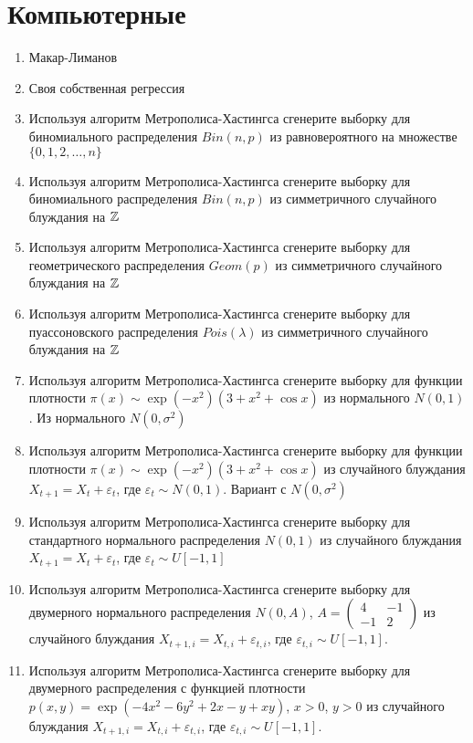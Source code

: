 \documentclass[pdftex,12pt,a4paper]{article}
\begin{document}
\section{Компьютерные}

\begin{enumerate}
\item Макар-Лиманов
\item Своя собственная регрессия 


\item Используя алгоритм Метрополиса-Хастингса сгенерите выборку для биномиального распределения $Bin(n,p)$ из равновероятного на множестве $\{0,1,2,\ldots,n\}$

\item Используя алгоритм Метрополиса-Хастингса сгенерите выборку для биномиального распределения $Bin(n,p)$ из симметричного случайного блуждания на $\mathbb Z$

\item Используя алгоритм Метрополиса-Хастингса сгенерите выборку для геометрического распределения $Geom(p)$ из симметричного случайного блуждания на $\mathbb Z$

\item Используя алгоритм Метрополиса-Хастингса сгенерите выборку для пуассоновского распределения $Pois(\lambda)$ из симметричного случайного блуждания на $\mathbb Z$

\item Используя алгоритм Метрополиса-Хастингса сгенерите выборку для функции плотности $\pi(x)\sim \exp(-x^2)(3+x^2+\cos x)$ из нормального $N(0,1)$. Из нормального $N(0,\sigma^2)$

\item Используя алгоритм Метрополиса-Хастингса сгенерите выборку для функции плотности $\pi(x)\sim \exp(-x^2)(3+x^2+\cos x)$ из случайного блуждания $X_{t+1}=X_t+\varepsilon_t$, где $\varepsilon_t\sim N(0,1)$. Вариант с $N(0,\sigma^2)$

\item Используя алгоритм Метрополиса-Хастингса сгенерите выборку для стандартного нормального распределения $N(0,1)$ из случайного блуждания $X_{t+1}=X_t+\varepsilon_t$, где $\varepsilon_t\sim U[-1,1]$

\item Используя алгоритм Метрополиса-Хастингса сгенерите выборку для двумерного нормального распределения $N(0,A)$, $A=\left(\begin{array}{cc}
4 & -1 \\ 
-1 & 2
\end{array}\right)$  
из случайного блуждания 
$X_{t+1,i}=X_{t,i}+\varepsilon_{t,i}$, 
где $\varepsilon_{t,i}\sim U[-1,1]$.

\item Используя алгоритм Метрополиса-Хастингса сгенерите выборку для двумерного распределения с функцией плотности 
$p(x,y)=\exp(-4x^2-6y^2+2x-y+xy)$, $x>0$, $y>0$ из случайного блуждания 
$X_{t+1,i}=X_{t,i}+\varepsilon_{t,i}$, 
где $\varepsilon_{t,i}\sim U[-1,1]$.



\end{enumerate}
\end{document}
